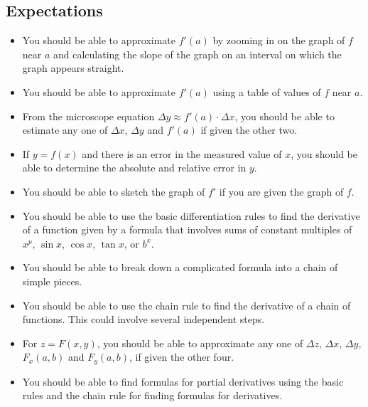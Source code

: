 \subsection{Expectations}
\label{subsec:expectations}
\begin{itemize}

\item You should be able to approximate $f'(a)$ by zooming in on the
  graph of $f$ near $a$ and calculating the slope of the graph on an
  interval on which the graph appears straight.

\item You should be able to approximate $f'(a)$ using a table of
  values of $f$ near $a$.

\item From the microscope equation $\Delta y \approx f'(a) \cdot
  \Delta x$, you should be able to estimate any one of $\Delta x$,
  $\Delta y$ and $f'(a)$ if given the other two.

\item If $y = f(x)$ and there is an error in the measured value of
  $x$, you should be able to determine the absolute and relative error
  in $y$.

\item You should be able to sketch the graph of $f'$ if you are given
  the graph of $f$.

\item You should be able to use the basic differentiation rules to
  find the derivative of a function given by a formula that involves
  sums of constant multiples of $x^p$, $\sin{x}$, $\cos{x}$,
  $\tan{x}$, or $b^x$.

\item You should be able to break down a complicated formula into a
  chain of simple pieces.

\item You should be able to use the chain rule to find the derivative
  of a chain of functions.  This could involve several independent
  steps.

\item For $z=F(x,y)$, you should be able to approximate any one of
  $\Delta z$, $\Delta x$, $\Delta y$, $F_x(a,b)$ and $F_y(a,b)$, if
  given the other four.

\item You should be able to find formulas for partial derivatives
  using the basic rules and the chain rule for finding formulas for
  derivatives.

\end{itemize}

